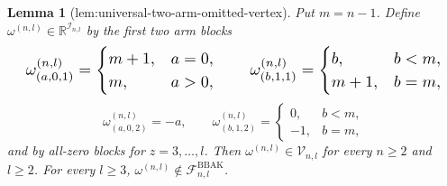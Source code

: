\documentclass{article}
\newtheorem{lemma}{Lemma}
\begin{document}
\begin{lemma}[lem:universal-two-arm-omitted-vertex]\label{lem:universal-two-arm-omitted-vertex}
Put \(m=n-1\). Define \(\omega^{(n,l)}\in\mathbb R^{\mathcal I_{n,l}}\) by the first two arm blocks
\[
\makebox[\linewidth][c]{\resizebox{0.98\linewidth}{!}{\par\noindent \makebox[\linewidth][c]{\resizebox{0.98\linewidth}{!}{\(\displaystyle \displaystyle \omega^{(n,l)}_{(a,0,1)}=\begin{cases}m+1,&a=0,\\m,&a>0,\end{cases}\qquad \omega^{(n,l)}_{(b,1,1)}=\begin{cases}b,&b<m,\\m+1,&b=m,\end{cases}\)}}\par\noindent}}
\]
\[\omega^{(n,l)}_{(a,0,2)}=-a,\qquad \omega^{(n,l)}_{(b,1,2)}=\begin{cases}0,&b<m,\\-1,&b=m,\end{cases}\]
and by all-zero blocks for \(z=3,\ldots,l\). Then \(\omega^{(n,l)}\in\mathcal V_{n,l}\) for every \(n\ge2\) and \(l\ge2\). For every \(l\ge3\), \(\omega^{(n,l)}\notin\mathcal F^{\mathrm{BBAK}}_{n,l}\).
\end{lemma}
\end{document}
